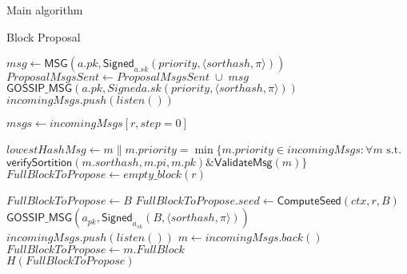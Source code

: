 \documentclass[10pt,a4paper]{article}
\begin{document}
\begin{section}{Main algorithm}
\begin{subsection}{Block Proposal}
\begin{algorithm}
\begin{algorithmic}[1]
                \State $msg \gets \mathsf{MSG}(a.pk, \mathsf{Signed}_{a.sk}(priority, \langle sorthash, \pi\rangle))$
                \State $ProposalMsgsSent \gets  ProposalMsgsSent\;\cup\;msg$
                \State $\mathsf{GOSSIP\_MSG}(a.pk, Signed{a.sk}(priority, \langle sorthash, \pi\rangle))$
            \EndIf
        \EndFor \\

            \State $incomingMsgs.push(listen())$
        \EndWhile

        \State $msgs \gets incomingMsgs[r, step=0]$

        \State $lowestHashMsg \gets m \| m.priority = \min \{m.priority \in incomingMsgs : \forall m \text{ s.t. } $\newline
        ${}$ {\hskip 3cm}  $\mathsf{verifySortition}(m.sorthash, m.pi, m.pk) \& \mathsf{ValidateMsg}(m) \}$ \\

        \State $FullBlockToPropose \gets empty\_block(r)$ 

            \State $FullBlockToPropose \gets B$
            \State $FullBlockToPropose.seed \gets \mathsf{ComputeSeed}(ctx, r, B)$
            \State $\mathsf{GOSSIP\_MSG}(a_{pk}, \mathsf{Signed}_{a_{sk}}(B, \langle sorthash, \pi \rangle))$
        \Else
        {
                \State $incomingMsgs.push(listen())$
                \State $m \gets incomingMsgs.back()$
                    \State $FullBlockToPropose \gets m.FullBlock$
                \EndIf
            \EndWhile \\
        }
        \EndIf
        \Return $H(FullBlockToPropose)$
    \EndFunction
    \end{algorithmic}
    \caption{\underline{Block proposal}}
\end{algorithm}


\end{subsection}
\end{section}
\end{document}
